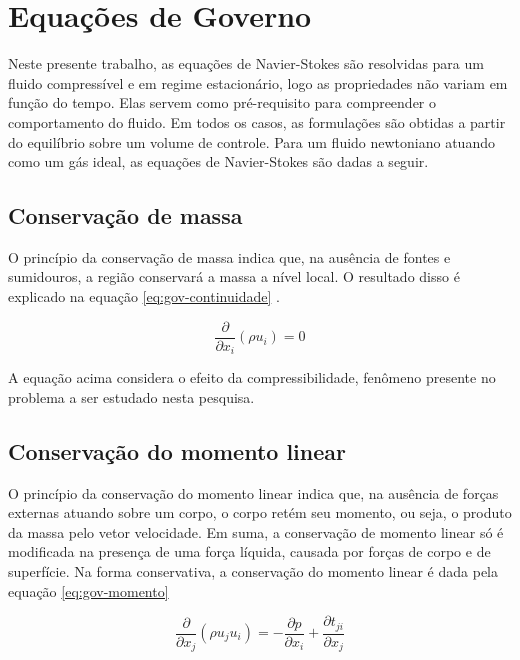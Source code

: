 \section{Equações de Governo}

Neste presente trabalho, as equações de Navier-Stokes são resolvidas para um fluido compressível e em regime estacionário, logo as propriedades não variam em função do tempo. Elas servem como pré-requisito para compreender o comportamento do fluido. Em todos os casos, as formulações são obtidas a partir do equilíbrio sobre um volume de controle. Para um fluido newtoniano atuando como um gás ideal, as equações de Navier-Stokes são dadas a seguir.

\subsection{Conservação de massa}

O princípio da conservação de massa indica que, na ausência de fontes e sumidouros, a região conservará a massa a nível local. O resultado disso é explicado na equação \ref{eq:gov-continuidade} \cite{Moukalled2015, Wilcox2006}.

\begin{equation}
    \label{eq:gov-continuidade}
    \frac{\partial}{\partial x_i}(\rho u_i) = 0
\end{equation}

A equação acima considera o efeito da compressibilidade, fenômeno presente no problema a ser estudado nesta pesquisa.

\subsection{Conservação do momento linear}

O princípio da conservação do momento linear indica que, na ausência de forças externas atuando sobre um corpo, o corpo retém seu momento, ou seja, o produto da massa pelo vetor velocidade. Em suma, a conservação de momento linear só é modificada na presença de uma força líquida, causada por forças de corpo e de superfície. Na forma conservativa, a conservação do momento linear é dada pela equação \ref{eq:gov-momento} \cite{Moukalled2015, Wilcox2006}

\begin{equation}
    \label{eq:gov-momento}
    \frac{\partial}{\partial x_j}(\rho u_j u_i) = -\frac{\partial p}{\partial x_i} + \frac{\partial t_{ji}}{\partial x_j}
\end{equation}


